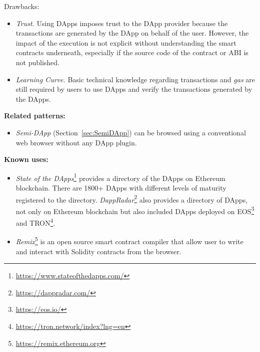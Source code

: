 Drawbacks: 
\begin{itemize}
   \item \textit{Trust.} Using DApps imposes trust to the DApp provider because the transactions are generated by the DApp on behalf of the user. However, the impact of the execution is not explicit without understanding the smart contracts underneath, especially if the source code of the contract or ABI is not published. 
   \item \textit{Learning Curve.} Basic technical knowledge regarding transactions and \textit{gas}  are still required by users to use DApps and verify the transactions generated by the DApps.
\end{itemize}


\vspace{0.5em}\noindent \textbf{Related patterns:}
\begin{itemize}
    \item \textit{Semi-DApp} (Section~\ref{sec:SemiDApp}) can be browsed using a conventional web browser without any DApp plugin.
\end{itemize}



\vspace{0.5em}\noindent \textbf{Known uses:}
\begin{itemize}
  \item \textit{State of the DApps}\footnote{\url{https://www.stateofthedapps.com/}} provides a directory of the DApps on Ethereum blockchain. There are 1800+ DApps with different levels of maturity registered to the directory.  
  \textit{DappRadar}\footnote{\url{https://dappradar.com/}} also provides a directory of DApps, not only on Ethereum blockchain but also included DApps deployed on EOS\footnote{\url{https://eos.io/}} and TRON\footnote{\url{https://tron.network/index?lng=en}}. %
  \item \textit{Remix}\footnote{\url{https://remix.ethereum.org}} is an open source smart contract compiler that allow user to write and interact with Solidity contracts from the browser.
\end{itemize}


